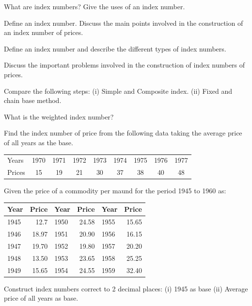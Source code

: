 \documentclass[11pt,a4paper]{article}
\begin{document}
\begin{longlist}
\item What are index numbers? Give the uses of an index number.

\item Define an index number. Discuss the main points involved in the construction of an index number of prices.

\item Define an index number and describe the different types of index numbers.

\item Discuss the important problems involved in the construction of index numbers of prices.

\item Compare the following steps: (i) Simple and Composite index. (ii) Fixed and chain base method.

\item What is the weighted index number?

\item Find the index number of price from the following data taking the average price of all years as the base.
\begin{center}
\begin{tabular}{l cccccccc}
\toprule
Years & 1970 & 1971 & 1972 & 1973 & 1974 & 1975 & 1976 & 1977 \\
Prices & 15 & 19 & 21 & 30 & 37 & 38 & 40 & 48 \\
\bottomrule
\end{tabular}
\end{center}

\item Given the price of a commodity per maund for the period 1945 to 1960 as:
\begin{center}
\begin{tabular}{l r l r l r}
\toprule
Year & Price & Year & Price & Year & Price \\
\midrule
1945 & 12.7 & 1950 & 24.58 & 1955 & 15.65 \\
1946 & 18.97 & 1951 & 20.90 & 1956 & 16.15 \\
1947 & 19.70 & 1952 & 19.80 & 1957 & 20.20 \\
1948 & 13.50 & 1953 & 23.65 & 1958 & 25.25 \\
1949 & 15.65 & 1954 & 24.55 & 1959 & 32.40 \\
\bottomrule
\end{tabular}
\end{center}
Construct index numbers correct to 2 decimal places: (i) 1945 as base (ii) Average price of all years as base.


\end{longlist}
\end{document}
